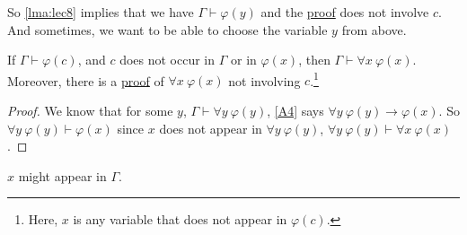 So \autoref{lma:lec8} implies that we have \(\Gamma \vdash \varphi (y)\) and the \hyperref[def:proof]{proof} does not involve \(c\). And sometimes, we want to be able to choose the variable \(y\) from above.

\begin{corollary}\label{col:lec8}
	If \(\Gamma \vdash \varphi (c)\), and \(c\) does not occur in \(\Gamma \) or in \(\varphi (x)\), then \(\Gamma \vdash \forall x\ \varphi (x)\). Moreover, there is a \hyperref[def:proof]{proof} of \(\forall x\ \varphi (x)\) not involving \(c\).\footnote{Here, \(x\) is any variable that does not appear in \(\varphi  (c)\).}
\end{corollary}
\begin{proof}
	We know that for some \(y\), \(\Gamma \vdash \forall y\ \varphi (y)\), \autoref{A4} says \(\forall y\ \varphi (y) \to  \varphi (x)\). So \(\forall y\ \varphi (y) \vdash \varphi (x)\) since \(x\) does not appear in \(\forall y\ \varphi (y)\), \(\forall y\ \varphi (y) \vdash \forall x\ \varphi (x)\).
\end{proof}

\begin{note}
	\(x\) might appear in \(\Gamma \).
\end{note}

